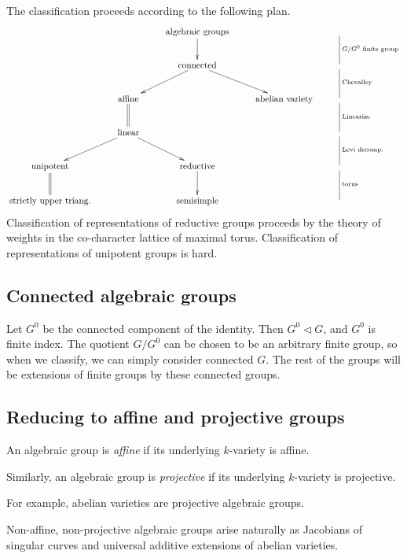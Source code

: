 The classification proceeds according to the following plan.
\[
\xymatrix{
&& \textrm{algebraic groups} \ar[d] & & \ar@{-}[d]^{G/G^0 \textrm{~finite group}} \\
&& \textrm{connected} \ar[dl] \ar[dr] & & \ar@{-}[d]^{\textrm{Chevalley}} \\
& \textrm{affine} \ar@{=}[d] && \textrm{abelian variety} & \ar@{-}[d]^{\textrm{Linearize}} \\
& \textrm{linear} \ar[dl] \ar[dr] && & \ar@{-}[d]^{\textrm{Levi decomp.}} \\
\textrm{unipotent} \ar@{=}[d] && \textrm{reductive} \ar[d] & & \ar@{-}[d]^{\textrm{torus}} \\
\textrm{strictly upper triang.} && \textrm{semisimple} & &
}
\]
Classification of representations of reductive groups proceeds by the theory of weights in the co-character lattice of maximal torus. Classification of representations of unipotent groups is hard.

\subsection{Connected algebraic groups}
\begin{rem}
Let $G^0$ be the connected component of the identity. Then $G^0 \triangleleft G$, and $G^0$ is finite index. The quotient $G/G^0$ can be chosen to be an arbitrary finite group, so when we classify, we can simply consider connected $G$. The rest of the groups will be extensions of finite groups by these connected groups.
\end{rem}

\subsection{Reducing to affine and projective groups}

\begin{defn}
An algebraic group is \emph{affine} if its underlying $k$-variety is affine.
\end{defn}
\begin{defn}
Similarly, an algebraic group is \emph{projective} if its underlying $k$-variety is projective.
\end{defn}
For example, abelian varieties are projective algebraic groups.

\begin{rem}
Non-affine, non-projective algebraic groups arise naturally as Jacobians of singular curves and universal additive extensions of abelian varieties.
\end{rem}


